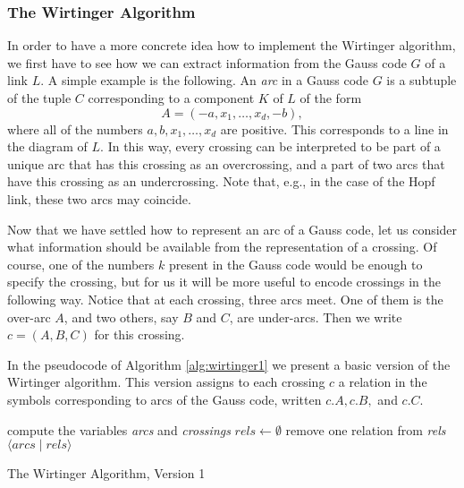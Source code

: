 \documentclass[a4paper]{article}
\theoremstyle{definition}
\begin{document}
\subsubsection{The Wirtinger Algorithm}
In order to have a more concrete idea how to implement the Wirtinger algorithm, we first have to see how we can extract information from the Gauss code $G$ of a link $L$. A simple example is the following. An \textit{arc} in a Gauss code $G$ is a subtuple of the tuple $C$ corresponding to a component $K$ of $L$ of the form $$A = (-a, x_1, \dots, x_d, -b),$$ where all of the numbers $a, b, x_1, \dots, x_d$ are positive. This corresponds to a line in the diagram of $L$. In this way, every crossing can be interpreted to be part of a unique arc that has this crossing as an overcrossing, and a part of two arcs that have this crossing as an undercrossing. Note that, e.g., in the case of the Hopf link, these two arcs may coincide.

Now that we have settled how to represent an arc of a Gauss code, let us consider what information should be available from the representation of a crossing. Of course, one of the numbers $k$ present in the Gauss code would be enough to specify the crossing, but for us it will be more useful to encode crossings in the following way. Notice that at each crossing, three arcs meet. One of them is the over-arc $A$, and two others, say $B$ and $C$, are under-arcs. Then we write $c = (A, B, C)$ for this crossing.

In the pseudocode of Algorithm \ref{alg:wirtinger1} we present a basic version of the Wirtinger algorithm. This version assigns to each crossing $c$ a relation in the symbols corresponding to arcs of the Gauss code, written $c.A, c.B,$ and $c.C$.

\begin{algorithm}\label{alg:wirtinger1}
compute the variables \textit{arcs} and \textit{crossings}\;
$\textit{rels} \leftarrow \emptyset$\;
remove one relation from \textit{rels}\;
\Return $\langle \textit{arcs} \; | \; \textit{rels}\rangle$\;
\caption{The Wirtinger Algorithm, Version 1}
\end{algorithm}
\end{document}
